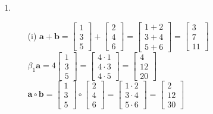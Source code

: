 \documentclass[11pt,letterpaper]{article}
\begin{document}
\begin{enumerate}
\begin{enumerate}
\item
\begin{enumerate}
\item [(i)] $\mathbf{a} + \mathbf{b} = \begin{bmatrix} 1 \\ 3 \\ 5 \end{bmatrix} + \begin{bmatrix} 2 \\ 4 \\ 6 \end{bmatrix} = \begin{bmatrix} 1 + 2 \\ 3 + 4 \\ 5 + 6 \end{bmatrix} = \begin{bmatrix} 3 \\ 7 \\ 11 \end{bmatrix}$\\
            $\beta_1 \mathbf{a} = 4 \begin{bmatrix} 1 \\ 3 \\ 5 \end{bmatrix} = \begin{bmatrix} 4 \cdot 1 \\ 4 \cdot 3 \\ 4 \cdot 5 \end{bmatrix} = \begin{bmatrix} 4 \\ 12 \\ 20 \end{bmatrix}$\\
            $\mathbf{a} \circ \mathbf{b} = \begin{bmatrix} 1 \\ 3 \\ 5 \end{bmatrix} \circ \begin{bmatrix} 2 \\ 4 \\ 6 \end{bmatrix} = \begin{bmatrix} 1 \cdot 2 \\ 3 \cdot 4 \\ 5 \cdot 6 \end{bmatrix} = \begin{bmatrix} 2 \\ 12 \\ 30 \end{bmatrix}$\\

\end{enumerate}
\end{enumerate}
\end{enumerate}
\end{document}

